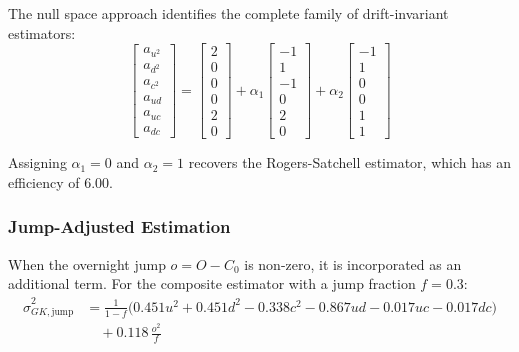 The null space approach identifies the complete family of drift-invariant estimators:
\begin{equation}
\begin{bmatrix} a_{u^2} \\ a_{d^2} \\ a_{c^2} \\ a_{ud} \\ a_{uc} \\ a_{dc} \end{bmatrix} = 
\begin{bmatrix} 2 \\ 0 \\ 0 \\ 0 \\ 2 \\ 0 \end{bmatrix} + 
\alpha_1 \begin{bmatrix} -1 \\ 1 \\ -1 \\ 0 \\ 2 \\ 0 \end{bmatrix} + 
\alpha_2 \begin{bmatrix} -1 \\ 1 \\ 0 \\ 0 \\ 1 \\ 1 \end{bmatrix}
\end{equation}

Assigning $\alpha_1 = 0$ and $\alpha_2 = 1$ recovers the Rogers-Satchell estimator, which has an efficiency of 6.00.

\subsubsection{Jump-Adjusted Estimation}

When the overnight jump $o = O - C_0$ is non-zero, it is incorporated as an additional term. For the composite estimator with a jump fraction $f = 0.3$:
\begin{equation}
\begin{split}
\hat{\sigma}^2_{GK,\text{jump}} 
  &= \frac{1}{1 - f}
    \Big(
      0.451u^2 + 0.451d^2 - 0.338c^2 
      - 0.867ud - 0.017uc - 0.017dc
    \Big) \\
  &\quad + 0.118\,\frac{o^2}{f}
\end{split}
\label{eq:gk_jump}
\end{equation}

